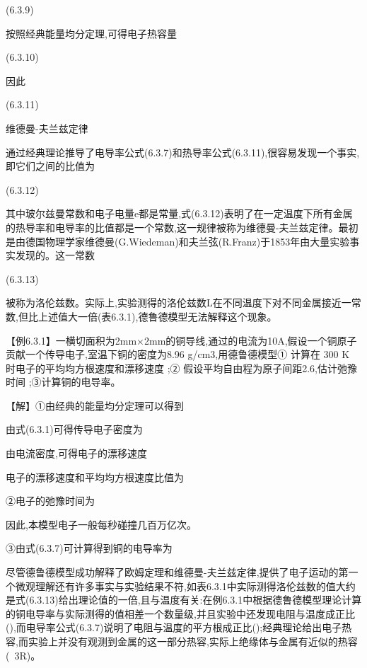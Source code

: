 	(6.3.9)

按照经典能量均分定理,可得电子热容量

 	(6.3.10)

因此

 	(6.3.11)





维德曼-夫兰兹定律

通过经典理论推导了电导率公式(6.3.7)和热导率公式(6.3.11),很容易发现一个事实,即它们之间的比值为

 	(6.3.12)

其中玻尔兹曼常数和电子电量e都是常量,式(6.3.12)表明了在一定温度下所有金属的热导率和电导率的比值都是一个常数,这一规律被称为维德曼-夫兰兹定律。最初是由德国物理学家维德曼(G.Wiedeman)和夫兰弦(R.Franz)于1853年由大量实验事实发现的。这一常数

	(6.3.13)

被称为洛伦兹数。实际上,实验测得的洛伦兹数L在不同温度下对不同金属接近一常数,但比上述值大一倍(表6.3.1),德鲁德模型无法解释这个现象。





【例6.3.1】一横切面积为2mm×2mm的铜导线,通过的电流为10A,假设一个铜原子贡献一个传导电子,室温下铜的密度为8.96 g/cm3,用德鲁德模型① 计算在 300 K 时电子的平均均方根速度和漂移速度 ;② 假设平均自由程为原子间距2.6,估计弛豫时间 ;③计算铜的电导率。

【解】①由经典的能量均分定理可以得到



由式(6.3.1)可得传导电子密度为



由电流密度,可得电子的漂移速度



电子的漂移速度和平均均方根速度比值为



②电子的弛豫时间为



因此,本模型电子一般每秒碰撞几百万亿次。

③由式(6.3.7)可计算得到铜的电导率为



尽管德鲁德模型成功解释了欧姆定理和维德曼-夫兰兹定律,提供了电子运动的第一个微观理解还有许多事实与实验结果不符,如表6.3.1中实际测得洛伦兹数的值大约是式(6.3.13)给出理论值的一倍,且与温度有关:在例6.3.1中根据德鲁德模型理论计算的铜电导率与实际测得的值相差一个数量级,并且实验中还发现电阻与温度成正比(),而电导率公式(6.3.7)说明了电阻与温度的平方根成正比();经典理论给出电子热容,而实验上并没有观测到金属的这一部分热容,实际上绝缘体与金属有近似的热容(~3R)。



